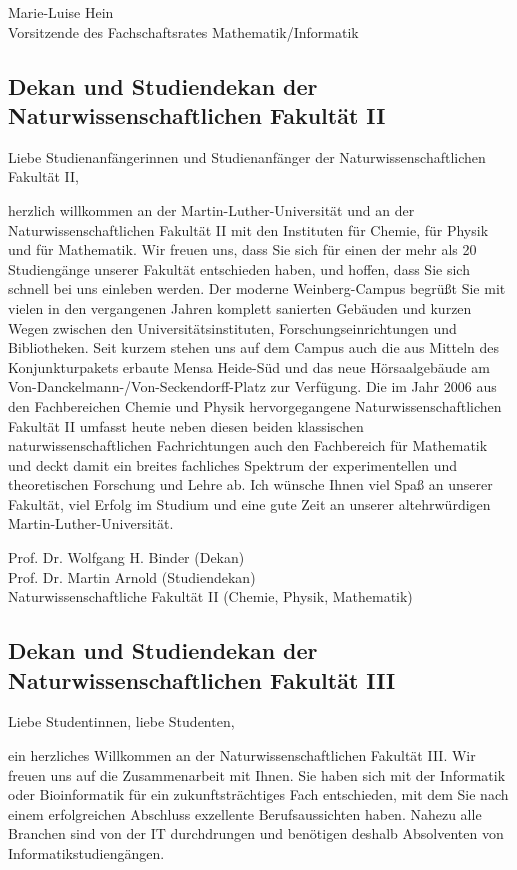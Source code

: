 Marie-Luise Hein\\
Vorsitzende des Fachschaftsrates Mathematik/Informatik


\subsection{Dekan und Studiendekan der Naturwissenschaftlichen Fakultät II}

Liebe Studienanfängerinnen und Studienanfänger der 
Naturwissenschaftlichen \newline Fakultät II,

herzlich willkommen an der Martin-Luther-Universität und an der 
Naturwissenschaftlichen Fakultät II mit den Instituten für Chemie, für Physik und für Mathematik.
Wir freuen uns, dass Sie sich für einen der mehr als 20 Studiengänge 
unserer Fakultät entschieden haben, und hoffen, dass Sie sich schnell 
bei uns einleben werden.
Der moderne Weinberg-Campus begrüßt Sie mit vielen in den vergangenen 
Jahren komplett sanierten Gebäuden und kurzen Wegen zwischen den 
Universitätsinstituten, Forschungseinrichtungen und Bibliotheken.
Seit kurzem stehen uns auf dem Campus auch die aus Mitteln des 
Konjunkturpakets erbaute Mensa Heide-Süd und das neue Hörsaalgebäude am 
Von-Danckelmann-/Von-Seckendorff-Platz zur Verfügung.
Die im Jahr 2006 aus den Fachbereichen Chemie und Physik hervorgegangene 
Naturwissenschaftlichen Fakultät II umfasst heute neben diesen beiden 
klassischen naturwissenschaftlichen Fachrichtungen auch den Fachbereich 
für Mathematik und deckt damit ein breites fachliches Spektrum der 
experimentellen und theoretischen Forschung und Lehre ab.
Ich wünsche Ihnen viel Spaß an unserer Fakultät, viel Erfolg im Studium 
und eine gute Zeit an unserer altehrwürdigen Martin-Luther-Universität.

Prof. Dr. Wolfgang H. Binder (Dekan)\\
Prof. Dr. Martin Arnold (Studiendekan)\\
Naturwissenschaftliche Fakultät II (Chemie, Physik, Mathematik)


\subsection{Dekan und Studiendekan der Naturwissenschaftlichen Fakultät III}

Liebe Studentinnen, liebe Studenten,

ein herzliches Willkommen an der Naturwissenschaftlichen Fakultät III.
Wir freuen uns auf die Zusammenarbeit mit Ihnen.
Sie haben sich mit der Informatik oder Bioinformatik für ein zukunftsträchtiges Fach entschieden, mit dem Sie nach einem erfolgreichen Abschluss exzellente Berufsaussichten haben.
Nahezu alle Branchen sind von der IT durchdrungen und benötigen deshalb Absolventen von Informatikstudiengängen.

